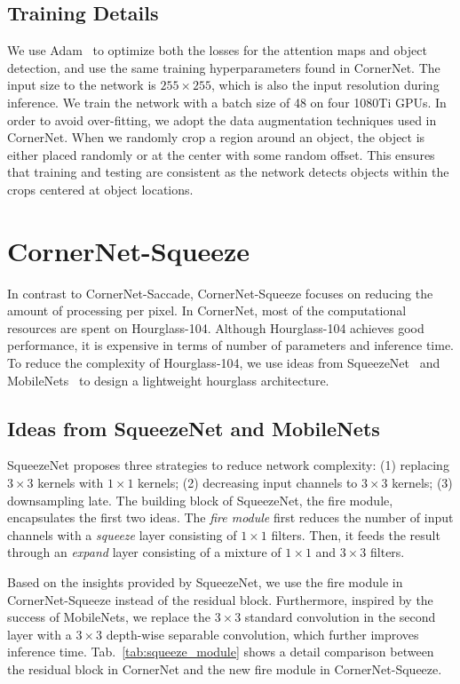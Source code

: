 \documentclass{bmvc2k}
\begin{document}
\subsection{Training Details}
We use Adam~\cite{kingma2014adam} to optimize both the losses for the attention maps and object detection, and use the same training hyperparameters found in CornerNet. The input size to the network is $255 \times 255$, which is also the input resolution during inference. We train the network with a batch size of 48 on four 1080Ti GPUs. In order to avoid over-fitting, we adopt the data augmentation techniques used in CornerNet. When we randomly crop a region around an object, the object is either placed randomly or at the center with some random offset. This ensures that training and testing are consistent as the network detects objects within the crops centered at object locations.

\section{CornerNet-Squeeze}
In contrast to CornerNet-Saccade, CornerNet-Squeeze focuses on reducing the amount of processing per pixel. In CornerNet, most of the computational resources are spent on Hourglass-104. Although Hourglass-104 achieves good performance, it is expensive in terms of number of parameters and inference time. To reduce the complexity of Hourglass-104, we use ideas from SqueezeNet~\cite{iandola2016squeezenet} and MobileNets~\cite{howard2017mobilenets} to design a lightweight hourglass architecture.

\subsection{Ideas from SqueezeNet and MobileNets}
SqueezeNet proposes three strategies to reduce network complexity: (1) replacing $3 \times 3$ kernels with $1 \times 1$ kernels; (2) decreasing input channels to $3 \times 3$ kernels; (3) downsampling late. The building block of SqueezeNet, the fire module, encapsulates the first two ideas. The \textit{fire module} first reduces the number of input channels with a \textit{squeeze} layer consisting of $1 \times 1$ filters. Then, it feeds the result through an \textit{expand} layer consisting of a mixture of $1 \times 1$ and $3 \times 3$ filters.

Based on the insights provided by SqueezeNet, we use the fire module in CornerNet-Squeeze instead of the residual block. Furthermore, inspired by the success of MobileNets, we replace the $3 \times 3$ standard convolution in the second layer with a $3 \times 3$ depth-wise separable convolution, which further improves inference time. Tab.~\ref{tab:squeeze_module} shows a detail comparison between the residual block in CornerNet and the new fire module in CornerNet-Squeeze. 
\end{document}
